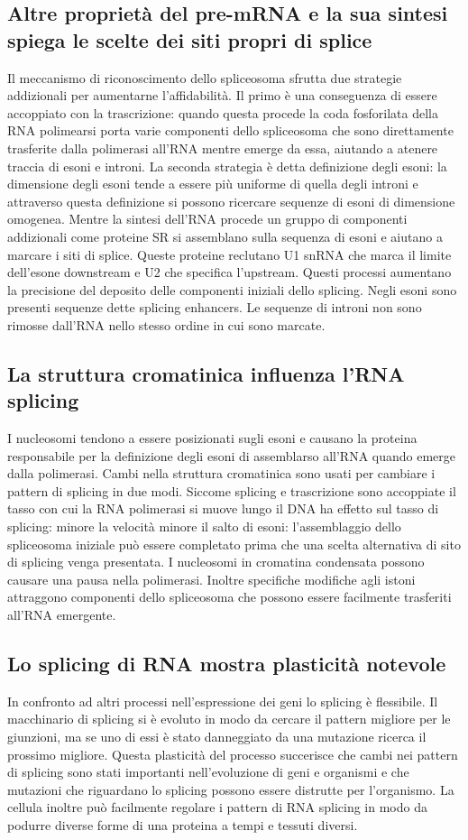 \subsection{Altre propriet\`a del pre-mRNA e la sua sintesi spiega le scelte dei siti propri di splice}
Il meccanismo di riconoscimento dello spliceosoma sfrutta due strategie addizionali per aumentarne l'affidabilit\`a. Il primo \`e una conseguenza di essere accoppiato con la 
trascrizione: quando questa procede la coda fosforilata della RNA polimearsi porta varie componenti dello spliceosoma che sono direttamente trasferite dalla polimerasi all'RNA mentre 
emerge da essa, aiutando a atenere traccia di esoni e introni. La seconda strategia \`e detta definizione degli esoni: la dimensione degli esoni tende a essere pi\`u uniforme di quella
degli introni e attraverso questa definizione si possono ricercare sequenze di esoni di dimensione omogenea. Mentre la sintesi dell'RNA procede un gruppo di componenti addizionali come 
proteine SR si assemblano sulla sequenza di esoni e aiutano a marcare i siti di splice. Queste proteine reclutano U1 snRNA che marca il limite dell'esone downstream e U2 che specifica
l'upstream. Questi processi aumentano la precisione del deposito delle componenti iniziali dello splicing. Negli esoni sono presenti sequenze dette splicing enhancers. Le sequenze di
introni non sono rimosse dall'RNA nello stesso ordine in cui sono marcate. 
\subsection{La struttura cromatinica influenza l'RNA splicing}
I nucleosomi tendono a essere posizionati sugli esoni e causano la proteina responsabile per la definizione degli esoni di assemblarso all'RNA quando emerge dalla polimerasi. Cambi 
nella struttura cromatinica sono usati per cambiare i pattern di splicing in due modi. Siccome splicing e trascrizione sono accoppiate il tasso con cui la RNA polimerasi si muove 
lungo il DNA ha effetto sul tasso di splicing: minore la velocit\`a minore il salto di esoni: l'assemblaggio dello spliceosoma iniziale pu\`o essere completato prima che una scelta 
alternativa di sito di splicing venga presentata. I nucleosomi in cromatina condensata possono causare una pausa nella polimerasi. Inoltre specifiche modifiche agli istoni attraggono 
componenti dello spliceosoma che possono essere facilmente trasferiti all'RNA emergente. 
\subsection{Lo splicing di RNA mostra plasticit\`a notevole}
In confronto ad altri processi nell'espressione dei geni lo splicing \`e flessibile. Il macchinario di splicing si \`e evoluto in modo da cercare il pattern migliore per le giunzioni, ma
se uno di essi \`e stato danneggiato da una mutazione ricerca il prossimo migliore. Questa plasticit\`a del processo succerisce che cambi nei pattern di splicing sono stati importanti
nell'evoluzione di geni e organismi e che mutazioni che riguardano lo splicing possono essere distrutte per l'organismo. La cellula inoltre pu\`o facilmente regolare i pattern di RNA
splicing in modo da podurre diverse forme di una proteina a tempi e tessuti diversi. 
